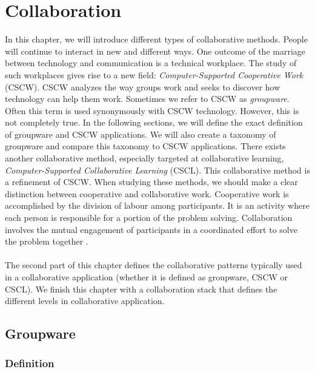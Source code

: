 \chapter{Collaboration}

In this chapter, we will introduce different types of collaborative methods. People will continue to interact in new and different ways. One outcome of the marriage between technology and communication is a technical workplace. The study of such workplaces gives rise to a new field: \textit{Computer-Supported Cooperative Work} (CSCW). CSCW analyzes the way groups work and seeks to discover how technology can help them work. Sometimes we refer to CSCW as \textit{groupware}. Often this term is used synonymously with CSCW technology. However, this is not completely true. In the following sections, we will define the exact definition of groupware and CSCW applications. We will also create a taxonomy of groupware and compare this taxonomy to CSCW applications. There exists another collaborative method, especially targeted at collaborative learning, \textit{Computer-Supported Collaborative Learning} (CSCL). This collaborative method is a refinement of CSCW. When studying these methods, we should make a clear distinction between cooperative and collaborative work. Cooperative work is accomplished by the division of labour among participants. It is an activity where each person is responsible for a portion of the problem solving. Collaboration involves the mutual engagement of participants in a coordinated effort to solve the problem together \cite{DivisionCSCL}.
\\ \\
The second part of this chapter defines the collaborative patterns typically used in a collaborative application (whether it is defined as groupware, CSCW or CSCL). We finish this chapter with a collaboration stack that defines the different levels in collaborative application.

\section{Groupware}

\subsection{Definition}

